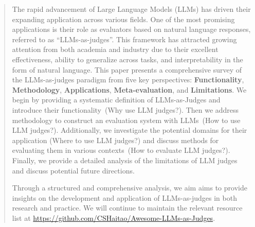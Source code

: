 \documentclass[acmsmall,screen]{acmart}
\begin{document}
\begin{abstract}

The rapid advancement of Large Language Models (LLMs) has driven their expanding application across various fields.
One of the most promising applications is their role as evaluators based on natural language responses, referred to as ``LLMs-as-judges''.
This framework has attracted growing attention from both academia and industry due to their excellent effectiveness, ability to generalize across tasks, and interpretability in the form of natural language.
This paper presents a comprehensive survey of the LLMs-as-judges paradigm from five key perspectives: \textbf{Functionality}, \textbf{Methodology}, \textbf{Applications}, \textbf{Meta-evaluation}, and \textbf{Limitations}.
We begin by providing a systematic definition of LLMs-as-Judges and introduce their functionality~(Why use LLM judges?).
Then we address methodology to construct an evaluation system with LLMs~(How to use LLM judges?).
Additionally, we investigate the potential domains for their application (Where to use LLM judges?) and discuss methods for evaluating them in various contexts~(How to evaluate LLM judges?).
Finally, we provide a detailed analysis of the limitations of LLM judges and discuss potential future directions.

Through a structured and comprehensive analysis, we aim aims to provide insights on the development and application of LLMs-as-judges in both research and practice. We will continue to maintain the relevant resource list at \url{https://github.com/CSHaitao/Awesome-LLMs-as-Judges}.
\end{abstract}



\maketitle




















\newpage


\end{document}
